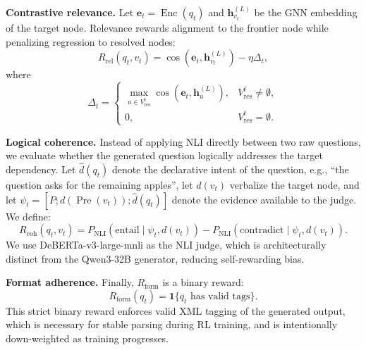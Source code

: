 \documentclass[sigconf, anonymous, review, screen]{acmart}
\begin{document}
\noindent
\textbf{Contrastive relevance.}
Let $\mathbf{e}_t=\operatorname{Enc}(q_t)$ and $\mathbf{h}^{(L)}_{v_t}$ be the GNN embedding of the target node. Relevance rewards alignment to the frontier node while penalizing regression to resolved nodes:
\begin{equation}
R_{\mathrm{rel}}(q_t,v_t)
=
\cos(\mathbf{e}_t,\mathbf{h}^{(L)}_{v_t})
-
\eta
\Delta_t,
\label{eq:rel_reward}
\end{equation}
where
\begin{equation}
\Delta_t =
\begin{cases}
\max\limits_{u\in V^t_{\mathrm{res}}}
\cos(\mathbf{e}_t,\mathbf{h}^{(L)}_u),
& V^t_{\mathrm{res}}\neq \emptyset,\\
0, & V^t_{\mathrm{res}}=\emptyset.
\end{cases}
\end{equation}

\noindent
\textbf{Logical coherence.}
Instead of applying NLI directly between two raw questions, we evaluate whether the generated question logically addresses the target dependency. Let $\hat d(q_t)$ denote the declarative intent of the question, e.g., ``the question asks for the remaining apples'', let $d(v_t)$ verbalize the target node, and let $\psi_t = [P; d(\operatorname{Pre}(v_t)); \hat d(q_t)]$ denote the evidence available to the judge. We define:
\begin{equation}
R_{\mathrm{coh}}(q_t,v_t)
=
P_{\mathrm{NLI}}(\mathrm{entail}\mid \psi_t, d(v_t))
-
P_{\mathrm{NLI}}(\mathrm{contradict}\mid \psi_t, d(v_t)).
\label{eq:coh_reward}
\end{equation}
We use DeBERTa-v3-large-mnli as the NLI judge, which is architecturally distinct from the Qwen3-32B generator, reducing self-rewarding bias.

\noindent
\textbf{Format adherence.}
Finally, $R_{\mathrm{form}}$ is a binary reward:
\begin{equation}
R_{\mathrm{form}}(q_t)
=
\mathbf{1}\{q_t \text{ has valid tags}\}.
\end{equation}
This strict binary reward enforces valid XML tagging of the generated output, which is necessary for stable parsing during RL training, and is intentionally down-weighted as training progresses.
\end{document}
